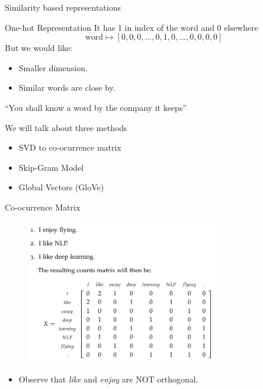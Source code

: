 \documentclass[handout]{beamer}
\begin{document}
\begin{frame}{Similarity based representations}
    \begin{block}{One-hot Representation}
        It has 1 in index of the word and 0 elsewhere
        $$\text{word} \mapsto [0,0,0,\ldots,0,1,0,\ldots,0,0,0,0]$$
        But we would like:
        \begin{itemize}
            \item Smaller dimension.
            \item Similar words are close by.
        \end{itemize}
    \end{block}
    ``You shall know a word by the company it keeps''\\[5mm]
    \hspace*{}

    We will talk about three methods
    \begin{itemize}
            \item SVD to co-ocurrence matrix
            \item Skip-Gram Model
            \item Global Vectors (GloVe)
    \end{itemize}

\end{frame}

\begin{frame}{Co-ocurrence Matrix}
    \begin{figure}[c]
    \includegraphics[width=0.75\textwidth]{coocurrence_matrix.png}
    \end{figure}
    \begin{itemize}
        \item Observe that \textit{like} and \textit{enjoy} are NOT orthogonal.
    \end{itemize}
\end{frame}
\end{document}
